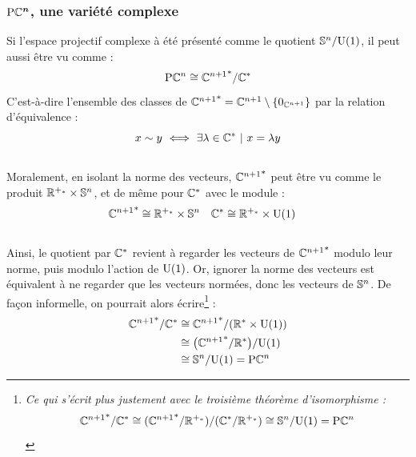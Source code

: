 \subsubsection{$\bf{\PC{n}}$, une variété complexe} \label{subsec:PC^n_variet}


Si l'espace projectif complexe à été présenté comme le quotient $\S{n}/\U{1}$, il peut aussi être vu comme :
\[\PC{n} \cong {\C^{n+1}}^*/\C^*\]
C'est-à-dire l'ensemble des classes de ${\C^{n+1}}^* = \C^{n+1} \setminus \{0_{\C^{n+1}}\}$ par la relation d'équivalence :
\[x \sim y\ \Llr\ \exists \lambda\in\C^*\ |\ x=\lambda y\]
\\
Moralement, en isolant la norme des vecteurs, ${\C^{n+1}}^*$ peut être vu comme le produit $\R^{+_*} \times \S{n}$, et de même pour $\C^*$ avec le module :
\begin{align*}
	{\C^{n+1}}^* &\cong \R^{+_*} \times \S{n}  &  \C^* &\cong \R^{+_*} \times \U{1}
\end{align*}
\\
Ainsi, le quotient par $\C^*$ revient à regarder les vecteurs de ${\C^{n+1}}^*$ modulo leur norme, puis modulo l'action de $\U{1}$. Or, ignorer la norme des vecteurs est équivalent à ne regarder que les vecteurs normées, donc les vecteurs de $\S{n}$. De façon informelle, on pourrait alors écrire\footnote{\itshape
	Ce qui s'écrit plus justement avec le troisième théorème d'isomorphisme : \[{\C^{n+1}}^*/\C^* \cong ({\C^{n+1}}^* / \R^{+_*})/(\C^* / \R^{+_*}) \cong \S{n}/\U{1} = \PC{n}\]
} :
\begin{align*}
	{\C^{n+1}}^*/\C^* &\cong {\C^{n+1}}^*/(\R^* \times \U{1})\\
	&\cong \big( {\C^{n+1}}^*/\R^* \big) /\U{1} \\
	&\cong \S{n}  / \U{1} = \PC{n} 
\end{align*}
\skipl

